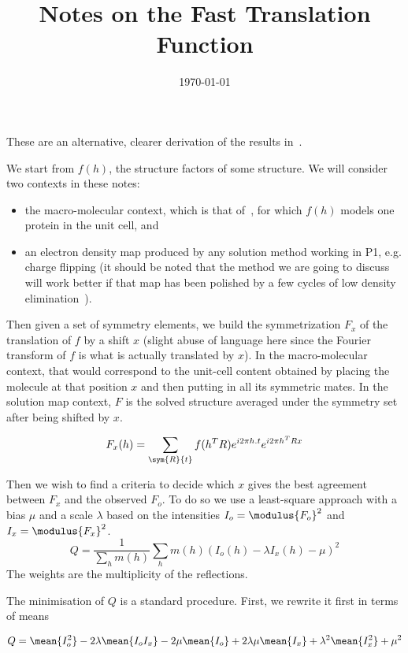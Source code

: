 \documentclass[11pt]{article}
\title{Notes on the Fast Translation Function}
\author{\lucjbourhis}
\date{\today}
\begin{document}
\maketitle

These are an alternative, clearer derivation of the results in~\cite{J.Navaza:1995}.

We start from $f(h)$, the structure factors of some structure. We will consider two contexts in these notes:
\begin{itemize}
\item the macro-molecular context, which is that of~\cite{J.Navaza:1995}, for which $f(h)$ models one protein in the unit cell, and
\item an electron density map produced by any solution method working in P1, e.g. charge flipping (it should be noted that the method we are going to discuss will work better if that map has been polished by a few cycles of low density elimination~\cite{Shiono:1992}).
\end{itemize}

Then given a set of symmetry elements, we build the symmetrization $F_x$ of the translation of $f$ by a shift $x$ (slight abuse of language here since the Fourier transform of $f$ is what is actually translated by $x$). In the macro-molecular context, that would correspond to the unit-cell content obtained by placing the molecule at that position $x$ and then putting in all its symmetric mates. In the solution map context, $F$ is the solved structure averaged under the symmetry set after being shifted by $x$.

\begin{equation}
F_x(h) = \sum_{\sym{R}{t}} f(h^T R) e^{i2\pi h.t} e^{i2\pi h^T R x}
\end{equation}

Then we wish to find a criteria to decide which $x$ gives the best agreement between $F_x$ and the observed $F_o$. To do so we use a least-square approach with a bias $\mu$ and a scale $\lambda$ based on the intensities $I_o = \modulus{F_o}^2$ and $I_x = \modulus{F_x}^2$.
\begin{equation}
Q = \frac{1}{\sum_h m(h)} \sum_h m(h) \left(I_o(h) - \lambda I_x(h) - \mu\right)^2
\end{equation}
The weights are the multiplicity of the reflections.

The minimisation of $Q$ is a standard procedure. First, we rewrite it first in terms of means

\begin{equation*}
Q = \mean{I_o^2} -2\lambda\mean{I_o I_x} -2\mu\mean{I_o} +2\lambda\mu\mean{I_x} + \lambda^2\mean{I_x^2} + \mu^2
\end{equation*}
\end{document}
